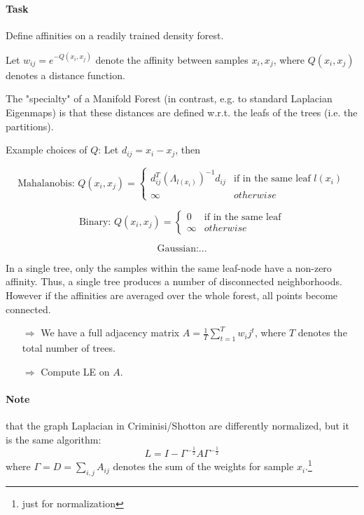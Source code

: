 \paragraph{Task} Define affinities on a readily trained density forest.

Let \(w_{ij} = e^{-Q(x_i, x_j)}\) denote the affinity between samples \(x_i,x_j\), where \(Q(x_i, x_j)\) denotes a distance function.

The "specialty" of a Manifold Forest (in contrast, e.g. to standard Laplacian Eigenmaps) is that these distances are defined w.r.t. the leafs of the trees (i.e. the partitions).

\bigbreak

Example choices of \(Q\): Let \(d_{ij} = x_i - x_j\), then

\[\text{Mahalanobis: } Q(x_i, x_j) = \begin{cases} d_{ij}^T(\Lambda_{l(x_i)})^{-1} d_{ij} & \text{if in the same leaf } l(x_i) \\ \infty & otherwise \end{cases}\]

\[\text{Binary: } Q(x_i, x_j) = \begin{cases} 0 & \text{if in the same leaf} \\ \infty & otherwise \end{cases}\]

\[\text{Gaussian:} ...\]

In a single tree, only the samples within the same leaf-node have a non-zero affinity. Thus, a single tree produces a number of disconnected neighborhoods.
However if the affinities are averaged over the whole forest, all points become connected.

\begin{itemize}
  \item[\(\Rightarrow\)] We have a full adjacency matrix \(A = \frac{1}{T} \sum_{t=1}^T w_ij^t\), where \(T\) denotes the total number of trees.
  \item[\(\Rightarrow\)] Compute LE on \(A\).
\end{itemize}

\paragraph{Note} that the graph Laplacian in Criminisi/Shotton  are differently normalized, but it is the same algorithm:
\[L = I - \Gamma^{-\frac{1}{2}} A \Gamma^{-\frac{1}{2}}\]
where \(\Gamma = D = \sum_{i,j} A_{ij}\) denotes the sum of the weights for sample \(x_i\).\footnote{just for normalization}

